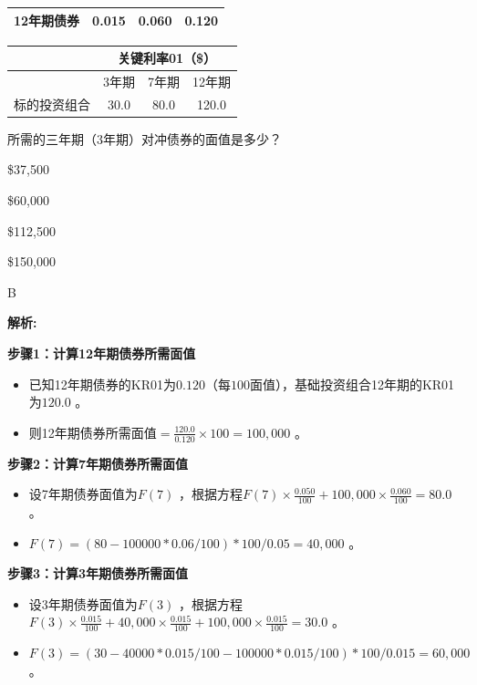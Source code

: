 \documentclass{article}
\newcounter{question} %
\newenvironment{explanation}
{\textbf{解析:}\par}
{\par}
\begin{document}
\begin{question}
\begin{center}
\begin{tabular}{|c|c|c|c|}
    12年期债券 & 0.015 & 0.060 & 0.120 \\
    \hline
    \end{tabular}
    \end{center}
    \begin{center}
    \begin{tabular}{|c|c|c|c|}
    \hline
    & \multicolumn{3}{c|}{关键利率01（\$）} \\
    \hline
    & 3年期 & 7年期 & 12年期 \\
    \hline
    标的投资组合 & 30.0 & 80.0 & 120.0 \\
    \hline
    \end{tabular}
    \end{center}
    所需的三年期（3年期）对冲债券的面值是多少？
    \end{question}
    
    \begin{choices}
        \item \$37,500
        \item \$60,000
        \item \$112,500
        \item \$150,000
    \end{choices}
    
    \begin{correctanswer}
        B
    \end{correctanswer}
    
    \begin{explanation}
    \textbf{步骤1：计算12年期债券所需面值}
    \begin{itemize}
        \item 已知12年期债券的KR01为\(0.120\)（每\(100\)面值），基础投资组合12年期的KR01为\(120.0\) 。
        \item 则12年期债券所需面值\(=\frac{120.0}{0.120}\times100 = 100,000\) 。
    \end{itemize}
    \textbf{步骤2：计算7年期债券所需面值}
    \begin{itemize}
        \item 设7年期债券面值为\(F(7)\) ，根据方程\(F(7)\times\frac{0.050}{100}+100,000\times\frac{0.060}{100}=80.0\) 。
        \item \(F(7)=(80-100000*0.06/100)*100/0.05=40,000\) 。
    \end{itemize}
    \textbf{步骤3：计算3年期债券所需面值}
    \begin{itemize}
        \item 设3年期债券面值为\(F(3)\) ，根据方程\(F(3)\times\frac{0.015}{100}+40,000\times\frac{0.015}{100}+100,000\times\frac{0.015}{100}=30.0\) 。
        \item \(F(3)=(30-40000*0.015/100-100000*0.015/100)*100/0.015=60,000\) 。
    \end{itemize}
    \end{explanation}
    
\end{document}
